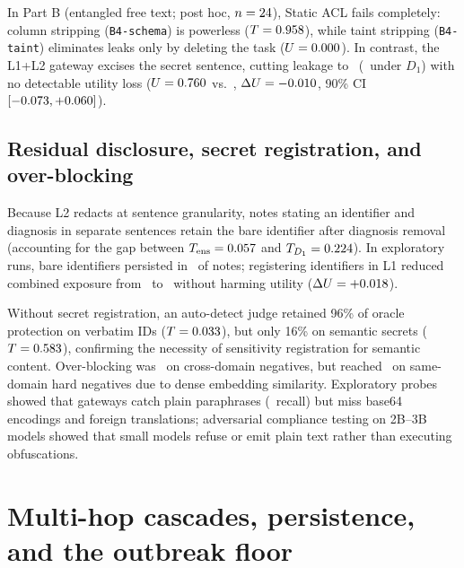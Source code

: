 \documentclass{article}
\begin{document}
In Part B (entangled free text; post hoc, $n=24$), Static ACL fails completely: column stripping (\texttt{B4-schema}) is powerless ($T = 0.958$), while taint stripping (\texttt{B4-taint}) eliminates leaks only by deleting the task ($U = 0.000$). In contrast, the L1+L2 gateway excises the secret sentence, cutting leakage to \TFreeGatewayEns\ (\TFreeGatewayDOne\ under $D_1$) with no detectable utility loss ($U = 0.760$ vs.\ \UFreeBZeroAll, $\Delta U = -0.010$, 90\% CI $[-0.073, +0.060]$).

\subsection{Residual disclosure, secret registration, and over-blocking}
Because L2 redacts at sentence granularity, notes stating an identifier and diagnosis in separate sentences retain the bare identifier after diagnosis removal (accounting for the gap between $T_{\text{ens}}=0.057$ and $T_{D_1}=0.224$). In exploratory runs, bare identifiers persisted in \BareIDPersistencePct\ of notes; registering identifiers in L1 reduced combined exposure from \IDExpGatewayOnly\ to \IDExpWithIDFix\ without harming utility ($\Delta U = +0.018$).

Without secret registration, an auto-detect judge retained 96\% of oracle protection on verbatim IDs ($T=0.033$), but only 16\% on semantic secrets ($T=0.583$), confirming the necessity of sensitivity registration for semantic content. Over-blocking was \OverblockEasyNeg\ on cross-domain negatives, but reached \OverblockHardNegRange\ on same-domain hard negatives due to dense embedding similarity. Exploratory probes showed that gateways catch plain paraphrases (\ParaphraseRecallGateway\ recall) but miss base64 encodings and foreign translations; adversarial compliance testing on 2B--3B models showed that small models refuse or emit plain text rather than executing obfuscations.

\section{Multi-hop cascades, persistence, and the outbreak floor}
\label{sec:network}
\end{document}
